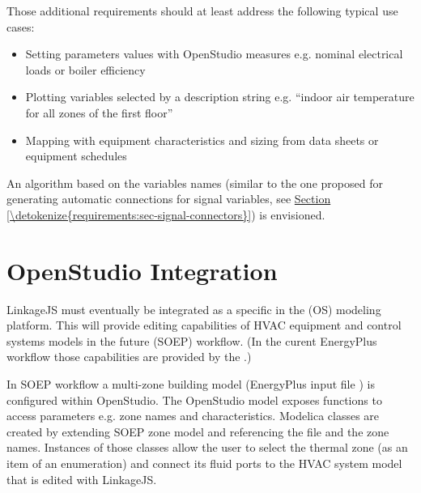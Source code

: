 \documentclass[letterpaper,10pt, openany,english]{sphinxmanual}
\begin{document}
Those additional requirements should at least address the following typical use cases:
\begin{itemize}
\item {} 
Setting parameters values with OpenStudio measures e.g. nominal electrical loads or boiler efficiency

\item {} 
Plotting variables selected by a description string e.g. “indoor air temperature for all zones of the first floor”

\item {} 
Mapping with equipment characteristics and sizing from data sheets or equipment schedules

\end{itemize}

An algorithm based on the variables names (similar to the one proposed for generating automatic connections for signal variables, see \hyperref[\detokenize{requirements:sec-signal-connectors}]{Section \ref{\detokenize{requirements:sec-signal-connectors}}}) is envisioned.


\section{OpenStudio Integration}
\label{\detokenize{requirements:openstudio-integration}}
LinkageJS must eventually be integrated as a specific  in the  (OS) modeling platform. This will provide editing capabilities of HVAC equipment and control systems models in the future  (SOEP) workflow. (In the curent EnergyPlus workflow those capabilities are provided by the .)

In SOEP workflow a multi-zone building model (EnergyPlus input file ) is configured within OpenStudio. The OpenStudio model  exposes functions to access  parameters e.g. zone names and characteristics. Modelica classes are created by extending SOEP zone model and referencing the  file and the zone names. Instances of those classes allow the user to select the thermal zone (as an item of an enumeration) and connect its fluid ports to the HVAC system model that is edited with LinkageJS.
\end{document}
